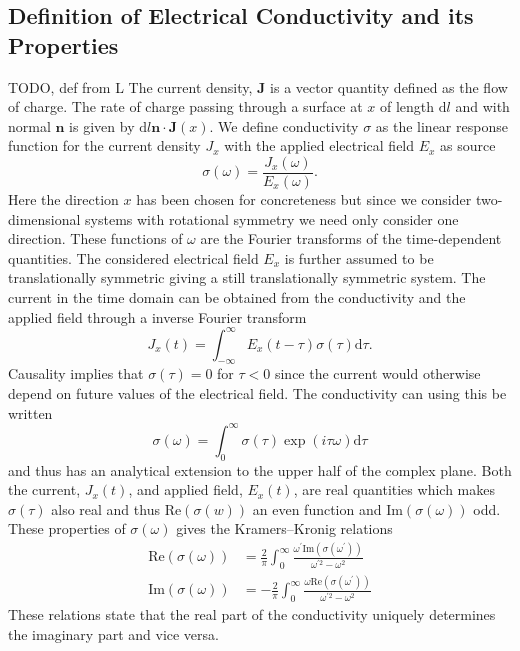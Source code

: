 \documentclass[12pt]{report}
\renewcommand{\d}{\ensuremath{\mathrm{d}}}
\renewcommand{\i}{\ensuremath{i}}
\newcommand{\re}{\ensuremath{\mathrm{Re}}}
\newcommand{\im}{\ensuremath{\mathrm{Im}}}
\begin{document}
\subsection{Definition of Electrical Conductivity and its Properties}
TODO, def from L
The current density, $\mathbf{J}$ is a vector quantity defined as the flow of charge. The rate of charge passing through a surface at $x$ of length $\d l$ and with normal $\mathbf{n}$ is given by $\d l\mathbf{n}\cdot \mathbf{J}(x)$.
We define conductivity $\sigma$ as the linear response function for the current density $J_x$ with the applied electrical field $E_x$ as source
\begin{equation}
 \sigma(\omega)=\frac{J_x(\omega)}{E_x(\omega)}\label{sigma}.
\end{equation}
Here the direction $x$ has been chosen for concreteness but since we consider two-dimensional systems with rotational symmetry we need only consider one direction. These functions of $\omega$ are the Fourier transforms of the time-dependent quantities. The considered electrical field $E_x$ is further assumed to be translationally symmetric giving a still translationally symmetric system. The current in the time domain can be obtained from the conductivity and the applied field through a inverse Fourier transform
\begin{equation}
 J_x(t)=\int_{-\infty}^\infty E_x(t-\tau)\sigma(\tau)\d \tau.
\end{equation}
Causality implies that $\sigma(\tau)=0$ for $\tau<0$ since the current would otherwise depend on future values of the electrical field. The conductivity can using this be written
\begin{equation}
 \sigma(\omega)=\int_0^\infty\sigma(\tau)\exp(\i\tau\omega)\d\tau
\end{equation}
and thus has an analytical extension to the upper half of the complex plane. Both the current, $J_x(t)$, and applied field, $E_x(t)$, are real quantities which makes $\sigma(\tau)$ also real and thus $\re(\sigma(w))$ an even function and $\im(\sigma(\omega))$ odd. These properties of $\sigma(\omega)$ gives the Kramers–Kronig relations
\begin{equation}
\begin{split}
 \re(\sigma(\omega))&=\frac{2}{\pi}\int_0^\infty\frac{\omega^\prime\im(\sigma(\omega^\prime))}{\omega^{\prime 2}-\omega^2}\\
\im(\sigma(\omega))&=-\frac{2}{\pi}\int_0^\infty\frac{\omega\re(\sigma(\omega^\prime))}{\omega^{\prime 2}-\omega^2}\label{kk}
\end{split}
\end{equation}
These relations state that the real part of the conductivity uniquely determines the imaginary part and vice versa.
\end{document}
